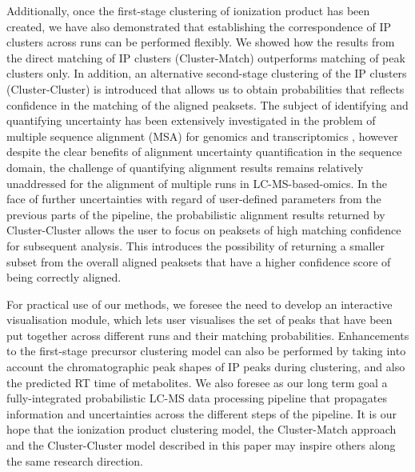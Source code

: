 Additionally, once the first-stage clustering of ionization product has been created, we have also demonstrated that establishing the correspondence of IP clusters across runs can be performed flexibly. We showed how the results from the direct matching of IP clusters (Cluster-Match) outperforms matching of peak clusters only. In addition, an alternative second-stage clustering of the IP clusters (Cluster-Cluster) is introduced that allows us to obtain probabilities that reflects confidence in the matching of the aligned peaksets. The subject of identifying and quantifying uncertainty has been extensively investigated in the problem of multiple sequence alignment (MSA) for genomics and transcriptomics \cite[see e.g.\ ][]{Landan2009, Notredame2000, Penn2010}, however despite the clear benefits of alignment uncertainty quantification in the sequence domain, the challenge of quantifying alignment results remains relatively unaddressed for the alignment of multiple runs in LC-MS-based-omics. In the face of further uncertainties with regard of user-defined parameters from the previous parts of the pipeline, the probabilistic alignment results returned by Cluster-Cluster allows the user to focus on peaksets of high matching confidence for subsequent analysis.  This introduces the possibility of returning a smaller subset from the overall aligned peaksets that have a higher confidence score of being correctly aligned. 

For practical use of our methods, we foresee the need to develop an interactive visualisation module, which lets user visualises the set of peaks that have been put together across different runs and their matching probabilities. Enhancements to the first-stage precursor clustering model can also be performed by taking into account the chromatographic peak shapes of IP peaks during clustering, and also the predicted RT time of metabolites. We also foresee as our long term goal a fully-integrated probabilistic LC-MS data processing pipeline that propagates information and uncertainties across the different steps of the pipeline. It is our hope that the ionization product clustering model, the Cluster-Match approach and the Cluster-Cluster model described in this paper may inspire others along the same research direction.